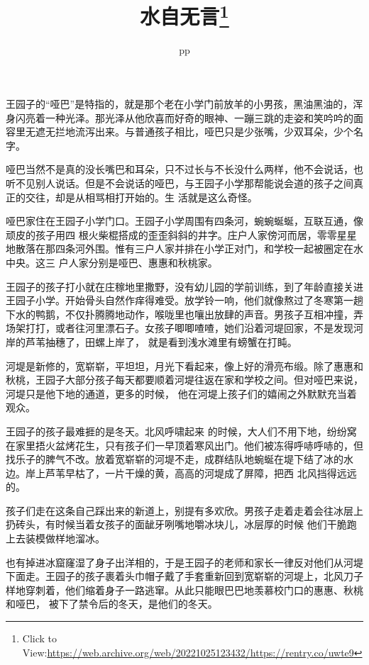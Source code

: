 \documentclass{article}
\title{水自无言\footnote{Click to View:\url{https://web.archive.org/web/20221025123432/https://rentry.co/uwte9}}}
\author{pp}
\date{}
\begin{document}

\maketitle


\Large

﻿王园子的“哑巴”是特指的，就是那个老在小学门前放羊的小男孩，黑油黑油的，浑身闪亮着一种光泽。那光泽从他欣喜而好奇的眼神、一蹦三跳的走姿和笑吟吟的面容里无遮无拦地流泻出来。与普通孩子相比，哑巴只是少张嘴，少双耳朵，少个名字。
 

哑巴当然不是真的没长嘴巴和耳朵，只不过长与不长没什么两样，他不会说话，也听不见别人说话。但是不会说话的哑巴，与王园子小学那帮能说会道的孩子之间真正的交往，却是从相骂相打开始的。生
活就是这么奇怪。 

哑巴家住在王园子小学门口。王园子小学周围有四条河，蜿蜿蜒蜒，互联互通，像顽皮的孩子用四
\newpage
根火柴棍搭成的歪歪斜斜的井字。庄户人家傍河而居，零零星星地散落在那四条河外围。惟有三户人家并排在小学正对门，和学校一起被圈定在水中央。这三
户人家分别是哑巴、惠惠和秋桃家。 

王园子的孩子打小就在庄稼地里撒野，没有幼儿园的学前训练，到了年龄直接关进王园子小学。开始骨头自然作痒得难受。放学铃一响，他们就像熬过了冬寒第一趟下水的鸭鹅，不仅扑腾腾地动作，喉咙里也嚷出放肆的声音。男孩子互相冲撞，弄场架打打，或者往河里漂石子。女孩子唧唧喳喳，她们沿着河堤回家，不是发现河岸的芦苇抽穗了，田螺上岸了，
就是看到浅水滩里有螃蟹在打盹。 

河堤是新修的，宽崭崭，平坦坦，月光下看起来，像上好的滑亮布缎。除了惠惠和秋桃，王园子大部分孩子每天都要顺着河堤往返在家和学校之间。但对哑巴来说，河堤只是他下地的通道，更多的时候，
他在河堤上孩子们的嬉闹之外默默充当着观众。 

王园子的孩子最难捱的是冬天。北风呼啸起来
\newpage
的时候，大人们不用下地，纷纷窝在家里捂火盆烤花生，只有孩子们一早顶着寒风出门。他们被冻得呼哧呼哧的，但找乐子的脾气不改。放着宽崭崭的河堤不走，成群结队地蜿蜒在堤下结了冰的水边。岸上芦苇早枯了，一片干燥的黄，高高的河堤成了屏障，把西
北风挡得远远的。 

孩子们走在这条自己踩出来的新道上，别提有多欢欣。男孩子走着走着会往冰层上扔砖头，有时候当着女孩子的面龇牙咧嘴地嚼冰块儿，冰层厚的时候
他们干脆跑上去装模做样地溜冰。 

也有掉进冰窟窿湿了身子出洋相的，于是王园子的老师和家长一律反对他们从河堤下面走。王园子的孩子裹着头巾帽子戴了手套重新回到宽崭崭的河堤上，北风刀子样地穿刺着，他们缩着身子一路逃窜。从此只能眼巴巴地羡慕校门口的惠惠、秋桃和哑巴，
被下了禁令后的冬天，是他们的冬天。 
\end{document}
